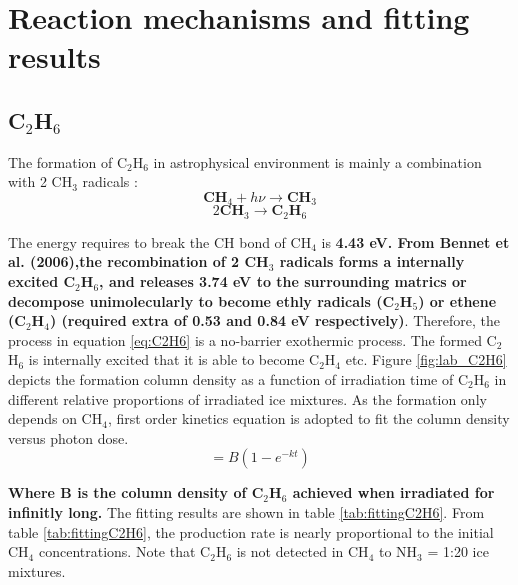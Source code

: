 \section{Reaction mechanisms and fitting results} %
\subsection{C$_2$H$_6$}
The formation of C$_2$H$_6$ in astrophysical environment is mainly a combination with 2 CH$_3$ radicals \cite{bennett2006laboratory}:
\begin{equation}
\textbf{CH$_4$} + h\nu \rightarrow \textbf{CH$_3$}
\label{eq:CH3}
\end{equation}
\begin{equation}
2 \textbf{CH$_3$} \rightarrow \textbf{C$_2$H$_6$}
\label{eq:C2H6}
\end{equation}

The energy requires to break the CH bond of CH$_4$ is \textbf{4.43 eV\cite{bennett2006laboratory}. From Bennet et al. (2006)\cite{bennett2006laboratory},the recombination of 2 CH$_3$ radicals forms a internally excited C$_2$H$_6$, and releases 3.74 eV to the surrounding matrics or decompose unimolecularly to become ethly radicals (C$_2$H$_5$) or ethene (C$_2$H$_4$) (required extra of 0.53\cite{bennett2006laboratory} and 0.84 eV\cite{irle2000molecular} respectively)}. Therefore, the process in equation \ref{eq:C2H6} is a no-barrier exothermic process. The formed C$_2$H$_6$ is internally excited that it is able to become C$_2$H$_4$ etc. Figure \ref{fig:lab_C2H6} depicts the formation column density as a function of irradiation time of C$_2$H$_6$ in different relative proportions of irradiated ice mixtures.  As the formation only depends on CH$_4$, first order kinetics equation is adopted to fit the column density versus photon dose.\\

\begin{equation}
[\textbf{C$_2$H$_6$}] = B(1 - e^{-kt})
\label{eq:1step}
\end{equation}

\textbf{Where B is the column density of C$_2$H$_6$ achieved when irradiated for infinitly long.} The fitting results are shown in table \ref{tab:fittingC2H6}. From table \ref{tab:fittingC2H6}, the production rate is nearly proportional to the initial CH$_4$ concentrations.  Note that C$_2$H$_6$ is not detected in CH$_4$ to NH$_3$ = 1:20 ice mixtures.\\

